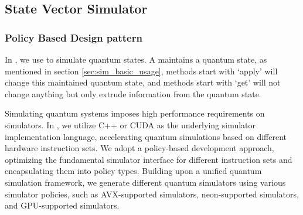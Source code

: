 \subsection{State Vector Simulator}
\label{sec_state_vec}
\subsubsection{Policy Based Design pattern}
In \MindQuantum, we use \Simulator to simulate quantum states. A \Simulator maintains a quantum state, as mentioned in section \ref{sec:sim_basic_usage}, methods start with `apply' will change this maintained quantum state, and methods start with `get' will not change anything but only extrude information from the quantum state.

Simulating quantum systems imposes high performance requirements on simulators. In \MindQuantum, we utilize C++ or CUDA as the underlying simulator implementation language, accelerating quantum simulations based on different hardware instruction sets. We adopt a policy-based development approach, optimizing the fundamental simulator interface for different instruction sets and encapsulating them into policy types. Building upon a unified quantum simulation framework, we generate different quantum simulators using various simulator policies, such as AVX-supported simulators, neon-supported simulators, and GPU-supported simulators.

